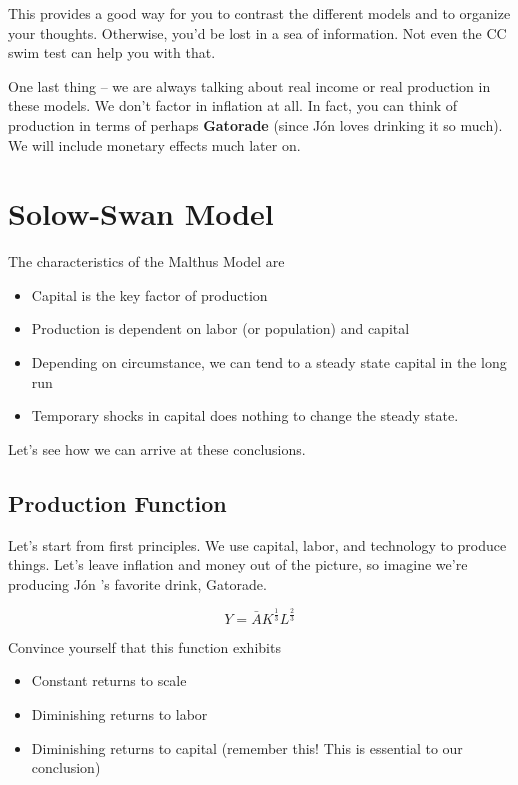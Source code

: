 \documentclass[11pt]{scrartcl}
\newcommand{\jon}{J\'{o}n }
\newcommand{\oneth}{\ensuremath{\frac{1}{3}}}
\newcommand{\twoth}{\ensuremath{\frac{2}{3}}}
\begin{document}
This provides a good way for you to contrast the different models and to organize your thoughts. Otherwise, you'd be lost in a sea of information. Not even the CC swim test can help you with that.

One last thing -- we are always talking about real income or real production in these models. We don't factor in inflation at all. In fact, you can think of production in terms of perhaps \textbf{Gatorade} (since \jon loves drinking it so much). We will include monetary effects much later on.

\section{Solow-Swan Model}

The characteristics of the Malthus Model are

\begin{itemize}
\item Capital is the key factor of production
\item Production is dependent on labor (or population) and capital
\item Depending on circumstance, we can tend to a steady state capital in the long run
\item Temporary shocks in capital does nothing to change the steady state. 
\end{itemize}

Let's see how we can arrive at these conclusions.

\subsection{Production Function}

Let's start from first principles. We use capital, labor, and technology to produce things. Let's leave inflation and money out of the picture, so imagine we're producing \jon's favorite drink, Gatorade.

\[ Y = \bar{A}K^{\oneth}L^{\twoth} \]

Convince yourself that this function exhibits

\begin{itemize}
\item Constant returns to scale
\item Diminishing returns to labor
\item Diminishing returns to capital (remember this! This is essential to our conclusion)
\end{itemize}
\end{document}
